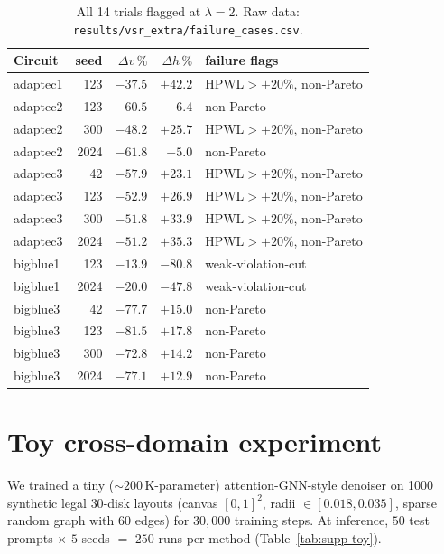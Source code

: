 \documentclass{article}
\begin{document}
\begin{table}[h]
\centering
\small
\begin{tabular}{lrrrl}
\toprule
Circuit & seed & $\Delta v\,\%$ & $\Delta h\,\%$ & failure flags \\
\midrule
adaptec1 & 123  & $-37.5$ & $+42.2$ & HPWL$>+20\%$, non-Pareto \\
adaptec2 & 123  & $-60.5$ &  $+6.4$ & non-Pareto \\
adaptec2 & 300  & $-48.2$ & $+25.7$ & HPWL$>+20\%$, non-Pareto \\
adaptec2 & 2024 & $-61.8$ &  $+5.0$ & non-Pareto \\
adaptec3 & 42   & $-57.9$ & $+23.1$ & HPWL$>+20\%$, non-Pareto \\
adaptec3 & 123  & $-52.9$ & $+26.9$ & HPWL$>+20\%$, non-Pareto \\
adaptec3 & 300  & $-51.8$ & $+33.9$ & HPWL$>+20\%$, non-Pareto \\
adaptec3 & 2024 & $-51.2$ & $+35.3$ & HPWL$>+20\%$, non-Pareto \\
bigblue1 & 123  & $-13.9$ & $-80.8$ & weak-violation-cut \\
bigblue1 & 2024 & $-20.0$ & $-47.8$ & weak-violation-cut \\
bigblue3 & 42   & $-77.7$ & $+15.0$ & non-Pareto \\
bigblue3 & 123  & $-81.5$ & $+17.8$ & non-Pareto \\
bigblue3 & 300  & $-72.8$ & $+14.2$ & non-Pareto \\
bigblue3 & 2024 & $-77.1$ & $+12.9$ & non-Pareto \\
\bottomrule
\end{tabular}
\caption{All 14 trials flagged at $\lambda{=}2$.
Raw data: \texttt{results/vsr\_extra/failure\_cases.csv}.}
\label{tab:supp-failures}
\end{table}

\section{Toy cross-domain experiment}
\label{sec:supp-toy2d}

We trained a tiny ($\sim 200$\,K-parameter) attention-GNN-style denoiser on
1000 synthetic legal $30$-disk layouts (canvas $[0,1]^2$, radii
$\in [0.018, 0.035]$, sparse random graph with $60$ edges) for $30{,}000$
training steps.  At inference, $50$ test prompts $\times$ $5$ seeds $=$ $250$
runs per method (Table~\ref{tab:supp-toy}).
\end{document}
